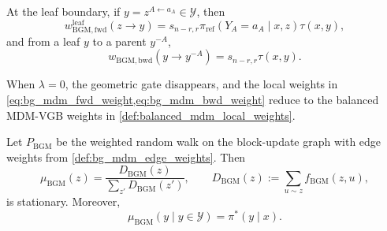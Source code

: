 \documentclass{article}
\numberwithin{theorem}{section}
\numberwithin{proposition}{section}
\numberwithin{corollary}{section}
\numberwithin{lemma}{section}
\numberwithin{conjecture}{section}
\numberwithin{remark}{section}
\numberwithin{definition}{section}
\numberwithin{assumption}{section}
\numberwithin{example}{section}
\newcommand{\calY}{{\mathcal{Y}}}
\providecommand{\base}{\pi_{\mathrm{ref}}}
\begin{document}
At the leaf boundary, if $y=z^{A\leftarrow a_A}\in\calY$, then
\begin{equation*}
\label{eq:bg_mdm_leaf_fwd_weight}
    w_{\mathrm{BGM,fwd}}^{\mathrm{leaf}}(z\to y)=s_{n-r,r}\base(Y_A=a_A\mid x,z)\tau(x,y),
\end{equation*}
and from a leaf $y$ to a parent $y^{-A}$,
\begin{equation*}
\label{eq:bg_mdm_leaf_bwd_weight}
    w_{\mathrm{BGM,bwd}}(y\to y^{-A})=s_{n-r,r}\tau(x,y).
\end{equation*}

\begin{remark}[$\lambda=0$ recovers balanced MDM-VGB]
When $\lambda=0$, the geometric gate disappears, and the local weights in \cref{eq:bg_mdm_fwd_weight,eq:bg_mdm_bwd_weight} reduce to the balanced MDM-VGB weights in \cref{def:balanced_mdm_local_weights}.
\end{remark}

\begin{theorem}
\label{thm:bg_mdm_stationarity}
Let $P_{\mathrm{BGM}}$ be the weighted random walk on the block-update graph with edge weights from \cref{def:bg_mdm_edge_weights}. Then
\begin{equation*}
    \mu_{\mathrm{BGM}}(z)=\frac{D_{\mathrm{BGM}}(z)}{\sum_{z'}D_{\mathrm{BGM}}(z')},\qquad
    D_{\mathrm{BGM}}(z):=\sum_{u\sim z}f_{\mathrm{BGM}}(z,u),
\end{equation*}
is stationary. Moreover,
\begin{equation*}
    \mu_{\mathrm{BGM}}(y\mid y\in\calY)=\pi^*(y\mid x).
\end{equation*}
\end{theorem}
\end{document}
